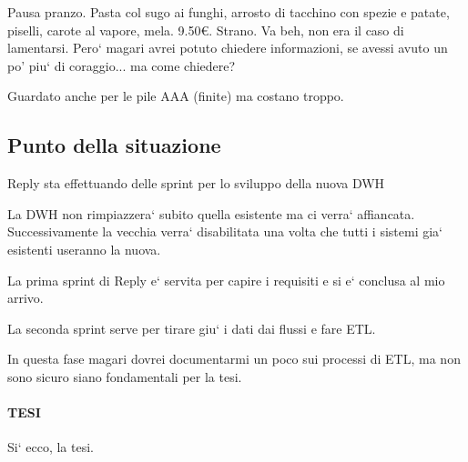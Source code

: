     Pausa pranzo.
    Pasta col sugo ai funghi, arrosto di tacchino con spezie e patate, piselli, carote al vapore, mela.
    9.50\euro{}. Strano. Va beh, non era il caso di lamentarsi. Pero` magari avrei potuto chiedere informazioni, se avessi avuto un po' piu` di coraggio... ma come chiedere?
    
    Guardato anche per le pile AAA (finite) ma costano troppo.
    
    \subsection{Punto della situazione}
        Reply sta effettuando delle sprint per lo sviluppo della nuova DWH
        
        La DWH non rimpiazzera` subito quella esistente ma ci verra` affiancata.
        Successivamente la vecchia verra` disabilitata una volta che tutti i sistemi gia` esistenti useranno la nuova.
        
        La prima sprint di Reply e` servita per capire i requisiti e si e` conclusa al mio arrivo.
        
        La seconda sprint serve per tirare giu` i dati dai flussi e fare ETL.
        
        In questa fase magari dovrei documentarmi un poco sui processi di ETL, ma non sono sicuro siano fondamentali per la tesi.
        
        \paragraph{TESI} Si` ecco, la tesi.
        
        
        
